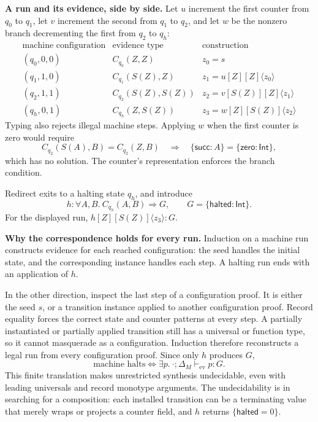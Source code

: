 \documentclass[10pt,a4paper]{article}
\newcommand{\Int}{\mathsf{Int}}
\newcommand{\iarg}[1]{\langle#1\rangle}
\newcommand{\kw}[1]{\mathsf{#1}}
\begin{document}
\textbf{A run and its evidence, side by side.}
Let $u$ increment the first counter from $q_0$ to $q_1$, let $v$ increment the
second from $q_1$ to $q_2$, and let $w$ be the nonzero branch decrementing the first
from $q_2$ to $q_h$:
\[
\begin{array}{c|c|l}
 \text{machine configuration} & \text{evidence type} & \text{construction}\\ \hline
 (q_0,0,0) & C_{q_0}(Z,Z) & z_0=s\\[3pt]
 (q_1,1,0) & C_{q_1}(S(Z),Z) & z_1=u[Z][Z]\iarg{z_0}\\[3pt]
 (q_2,1,1) & C_{q_2}(S(Z),S(Z)) & z_2=v[S(Z)][Z]\iarg{z_1}\\[3pt]
 (q_h,0,1) & C_{q_h}(Z,S(Z)) & z_3=w[Z][S(Z)]\iarg{z_2}
\end{array}
\]
Typing also rejects illegal machine steps. Applying $w$ when the first counter
is zero would require
\[
 C_{q_2}(S(A),B)=C_{q_2}(Z,B)
 \quad\Longrightarrow\quad
 \{\kw{succ}:A\}=\{\kw{zero}:\Int\},
\]
which has no solution. The counter's representation enforces the branch condition.

Redirect exits to a halting state $q_h$, and introduce
\[
 h:\forall A,B.\ C_{q_h}(A,B)\Rightarrow G,\qquad G=\{\kw{halted}:\Int\}.
\]
For the displayed run, $h[Z][S(Z)]\iarg{z_3}:G$.

\newpage
\textbf{Why the correspondence holds for every run.}
Induction on a machine run constructs evidence for each reached configuration:
the seed handles the initial state, and the corresponding instance handles each
step. A halting run ends with an application of $h$.

In the other direction, inspect the last step of a configuration proof.
It is either the seed $s$, or a transition instance applied to another configuration
proof. Record equality forces the correct state and counter patterns at every step.
A partially instantiated or partially applied transition still has a universal
or function type, so it cannot masquerade as a configuration. Induction therefore
reconstructs a legal run from every configuration proof. Since only $h$ produces $G$,
\[
 \boxed{\text{machine halts}\iff
        \exists p.\ \cdot;\Delta_M\vdash_{\mathrm{ev}}p:G.}
\]
This finite translation makes unrestricted synthesis undecidable, even with
leading universals and record monotype arguments.
The undecidability is in searching for a composition: each installed transition
can be a terminating value that merely wraps or projects a counter field, and
$h$ returns $\{\kw{halted}=0\}$.
\end{document}
